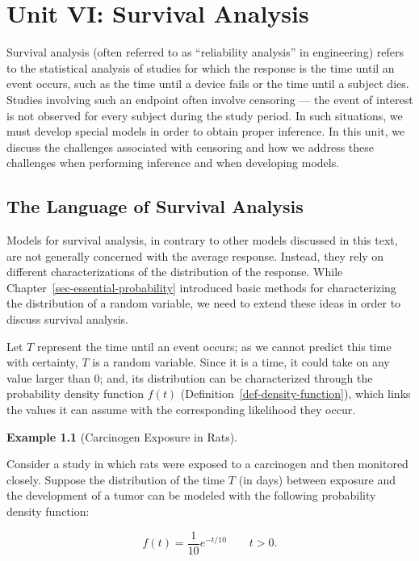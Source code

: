 \documentclass[
  letterpaper,
  DIV=11,
  numbers=noendperiod]{scrreprt}
\theoremstyle{definition}
\theoremstyle{definition}
\newtheorem{example}{Example}[chapter]
\theoremstyle{remark}
\begin{document}
\part{Unit VI: Survival Analysis}

Survival analysis (often referred to as ``reliability analysis'' in
engineering) refers to the statistical analysis of studies for which the
response is the time until an event occurs, such as the time until a
device fails or the time until a subject dies. Studies involving such an
endpoint often involve censoring --- the event of interest is not
observed for every subject during the study period. In such situations,
we must develop special models in order to obtain proper inference. In
this unit, we discuss the challenges associated with censoring and how
we address these challenges when performing inference and when
developing models.

\hypertarget{sec-surv-terminology}{%
\chapter{The Language of Survival Analysis}\label{sec-surv-terminology}}

\providecommand{\norm}[1]{\left\lVert#1\right\rVert}
\providecommand{\abs}[1]{\left\lvert#1\right\rvert}
\providecommand{\dist}[1]{\stackrel{\text{#1}}{\sim}}
\providecommand{\ind}[1]{\mathbb{I}\left(#1\right)}
\providecommand{\bm}[1]{\mathbf{#1}}
\providecommand{\bs}[1]{\boldsymbol{#1}}
\providecommand{\Ell}{\mathcal{L}}
\providecommand{\indep}{\perp\negthickspace\negmedspace\perp}

Models for survival analysis, in contrary to other models discussed in
this text, are not generally concerned with the average response.
Instead, they rely on different characterizations of the distribution of
the response. While Chapter~\ref{sec-essential-probability} introduced
basic methods for characterizing the distribution of a random variable,
we need to extend these ideas in order to discuss survival analysis.

Let \(T\) represent the time until an event occurs; as we cannot predict
this time with certainty, \(T\) is a random variable. Since it is a
time, it could take on any value larger than 0; and, its distribution
can be characterized through the probability density function \(f(t)\)
(Definition~\ref{def-density-function}), which links the values it can
assume with the corresponding likelihood they occur.

\begin{example}[Carcinogen Exposure in
Rats]\protect\hypertarget{exm-surv-rats}{}\label{exm-surv-rats}

Consider a study in which rats were exposed to a carcinogen and then
monitored closely. Suppose the distribution of the time \(T\) (in days)
between exposure and the development of a tumor can be modeled with the
following probability density function:

\[f(t) = \frac{1}{10} e^{-t/10} \qquad t > 0.\]

\end{example}
\end{document}
